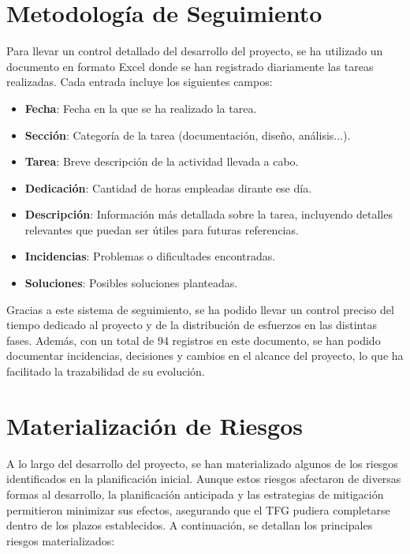 \section{Metodología de Seguimiento}

Para llevar un control detallado del desarrollo del proyecto, se ha utilizado un documento en formato Excel donde se han registrado diariamente las tareas realizadas. Cada entrada incluye los siguientes campos:

\begin{itemize}\setlength{\itemsep}{0pt}
    \item \textbf{Fecha}: Fecha en la que se ha realizado la tarea.
    \item \textbf{Sección}: Categoría de la tarea (documentación, diseño, análisis...).
    \item \textbf{Tarea}: Breve descripción de la actividad llevada a cabo.
    \item \textbf{Dedicación}: Cantidad de horas empleadas dirante ese día.
    \item \textbf{Descripción}: Información más detallada sobre la tarea, incluyendo detalles relevantes que puedan ser útiles para futuras referencias.
    \item \textbf{Incidencias}: Problemas o dificultades encontradas.
    \item \textbf{Soluciones}: Posibles soluciones planteadas.
\end{itemize}

Gracias a este sistema de seguimiento, se ha podido llevar un control preciso del tiempo dedicado al proyecto y de la distribución de esfuerzos en las distintas fases. Además, con un total de 94 registros en este documento, se han podido documentar incidencias, decisiones y cambios en el alcance del proyecto, lo que ha facilitado la trazabilidad de su evolución.


\section{Materialización de Riesgos}

A lo largo del desarrollo del proyecto, se han materializado algunos de los riesgos identificados en la planificación inicial. Aunque estos riesgos afectaron de diversas formas al desarrollo, la planificación anticipada y las estrategias de mitigación permitieron minimizar sus efectos, asegurando que el TFG pudiera completarse dentro de los plazos establecidos. A continuación, se detallan los principales riesgos materializados:

